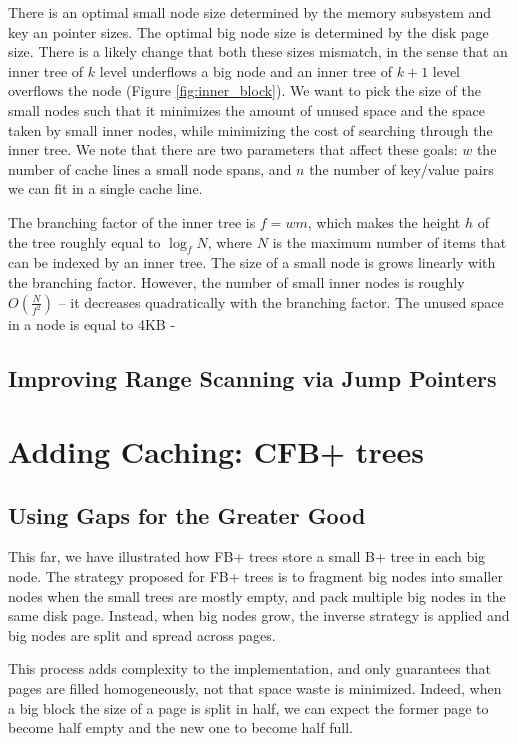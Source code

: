 \documentclass{article}
\begin{document}
There is an optimal small node size determined by the memory subsystem and key an pointer sizes. The optimal big node size is determined by the disk page size. There is a likely change that both these sizes  mismatch, in the sense that an inner tree of $k$ level underflows a big node and an inner tree of $k+1$ level overflows the node (Figure \ref{fig:inner_block}). We want to pick the size of the small nodes such that it minimizes the amount of unused space and the space taken by small inner nodes, while minimizing the cost of searching through the inner tree. We note that there are two parameters that affect these goals: $w$ the number of cache lines a small node spans, and $n$ the number of key/value pairs we can fit in a single cache line. 

The branching factor of the inner tree is $f=wm$, which makes the height $h$ of the tree roughly equal to $\log_f N$, where $N$ is the maximum number of items that can be indexed by an inner tree. The size of a small node is grows linearly with the branching factor. However, the number of small inner nodes is roughly $O(\frac{N}{f^2})$ -- it decreases quadratically with the branching factor. The unused space in a node is equal to 4KB - 

\subsection{Improving Range Scanning via Jump Pointers}

\section{Adding Caching: CFB+ trees}
\subsection{Using Gaps for the Greater Good}
This far, we have illustrated how FB+ trees store a small B+ tree in each big node.
The strategy proposed for FB+ trees is to fragment big nodes into smaller nodes when the small trees
are mostly empty, and pack multiple big nodes in the same disk page.
Instead, when big nodes grow, the inverse strategy is applied and big nodes are split and spread
across pages.

This process adds complexity to the implementation, and only guarantees that pages are filled
homogeneously, not that space waste is minimized.
Indeed, when a big block the size of a page is split in half,
we can expect the former page to become half empty and the new one to become half full.
\end{document}
